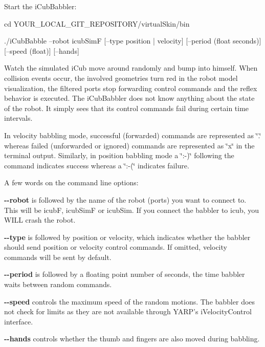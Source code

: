 Start the iCubBabbler: \begin{DoxyVerb}cd YOUR_LOCAL_GIT_REPOSITORY/virtualSkin/bin \end{DoxyVerb}
 \begin{DoxyVerb}./iCubBabble --robot icubSimF [--type position | velocity] [--period (float seconds)] [--speed (float)] [--hands] \end{DoxyVerb}


Watch the simulated iCub move around randomly and bump into himself. When collision events occur, the involved geometries turn red in the robot model visualization, the filtered ports stop forwarding control commands and the reflex behavior is executed. The iCubBabbler does not know anything about the state of the robot. It simply sees that its control commands fail during certain time intervals.

In velocity babbling mode, successful (forwarded) commands are represented as \char`\"{}.\char`\"{} whereas failed (unforwarded or ignored) commands are represented as \char`\"{}x\char`\"{} in the terminal output. Similarly, in position babbling mode a \char`\"{}:-\/)\char`\"{} following the command indicates success whereas a \char`\"{}:-\/(\char`\"{} indicates failure.

A few words on the command line options:
\begin{DoxyItemize}
\item {\bfseries -\/-\/robot} is followed by the name of the robot (ports) you want to connect to. This will be {\ttfamily icubF}, {\ttfamily icubSimF} or {\ttfamily icubSim}. If you connect the babbler to {\ttfamily icub}, you WILL crash the robot.
\item {\bfseries -\/-\/type} is followed by {\ttfamily position} or {\ttfamily velocity}, which indicates whether the babbler should send position or velocity control commands. If omitted, velocity commands will be sent by default.
\item {\bfseries -\/-\/period} is followed by a floating point number of seconds, the time babbler waits between random commands.
\item {\bfseries -\/-\/speed} controls the maximum speed of the random motions. The babbler does not check for limits as they are not available through YARP's iVelocityControl interface.
\item {\bfseries -\/-\/hands} controls whether the thumb and fingers are also moved during babbling.
\end{DoxyItemize}

